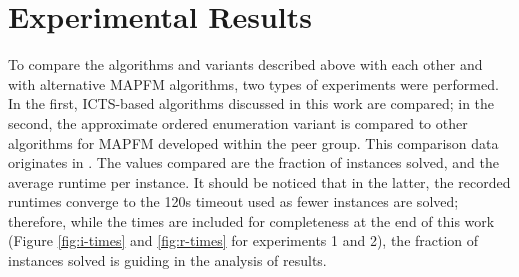 \documentclass[english,10pt]{article}
\begin{document}
	\section{Experimental Results}
	\label{experiments}
	To compare the algorithms and variants described above with each other and with alternative MAPFM algorithms, two types of experiments were performed. In the first, ICTS-based algorithms discussed in this work are compared; in the second, the approximate ordered enumeration variant is compared to other algorithms for MAPFM developed within the peer group. This comparison data originates in \cite{donszelmann2021}. The values compared are the fraction of instances solved, and the average runtime per instance. It should be noticed that in the latter, the recorded runtimes converge to the 120s timeout used as fewer instances are solved; therefore, while the times are included for completeness at the end of this work (Figure \ref{fig:i-times} and \ref{fig:r-times} for experiments 1 and 2), the fraction of instances solved is guiding in the analysis of results.
\end{document}
